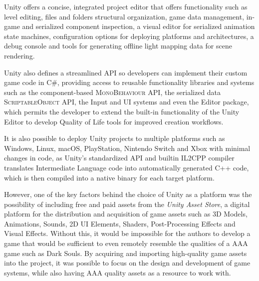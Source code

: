 \documentclass[cic,tc,english]{iiufrgs}
\begin{document}
Unity offers a concise, integrated project editor that offers functionality such as level editing, files and folders structural organization, game data management, in-game and serialized component inspection, a visual editor for serialized animation state machines, configuration options for deploying platforms and architectures, a debug console and tools for generating offline light mapping data for scene rendering.

Unity also defines a streamlined API so developers can implement their custom game code in \textsc{C\#}, providing access to reusable functionality libraries and systems such as the component-based \textsc{MonoBehaviour} API, the serialized data \textsc{ScriptableObject} API, the Input and UI systems and even the Editor package, which permits the developer to extend the built-in functionality of the Unity Editor to develop Quality of Life tools for improved creation workflows.

It is also possible to deploy Unity projects to multiple platforms such as Windows, Linux, macOS, PlayStation, Nintendo Switch and Xbox with minimal changes in code, as Unity's standardized API and builtin \textsc{IL2CPP} compiler translates Intermediate Language code into automatically generated \textsc{C++} code, which is then compiled into a native binary for each target platform.

However, one of the key factors behind the choice of Unity as a platform was the possibility of including free and paid assets from the \emph{Unity Asset Store}, a digital platform for the distribution and acquisition of game assets such as 3D Models, Animations, Sounds, 2D UI Elements, Shaders, Post-Processing Effects and Visual Effects. Without this, it would be impossible for the authors to develop a game that would be sufficient to even remotely resemble the qualities of a AAA game such as Dark Souls. By acquiring and importing high-quality game assets into the project, it was possible to focus on the design and development of game systems, while also having AAA quality assets as a resource to work with.
\end{document}
